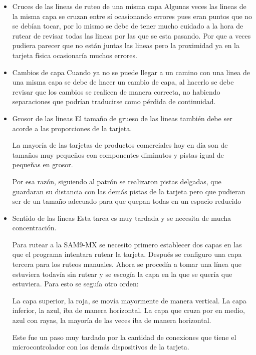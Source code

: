 \begin{itemize}
\item{Cruces de las lineas de ruteo de una misma capa}
Algunas veces las lineas de la misma capa se cruzan entre sí ocasionando errores pues eran puntos que no se debían tocar, por lo mismo se debe de tener mucho cuidado a la hora de rutear de revisar todas las lineas por las que se esta pasando. Por que a veces pudiera parecer que no están juntas las lineas pero la proximidad ya en la tarjeta física ocasionaría muchos errores.

\item{Cambios de capa}
Cuando ya no se puede llegar a un camino con una linea de una misma capa se debe de hacer un cambio de capa, al hacerlo se debe revisar que los cambios se realicen de manera correcta, no habiendo separaciones que podrían traducirse como pérdida de continuidad.

\item{Grosor de las lineas}
El tamaño de grueso de las lineas también debe ser acorde a las proporciones de la tarjeta. 

La mayoría de las tarjetas de productos comerciales hoy en día son de tamaños muy pequeños con componentes diminutos y pistas igual de pequeñas en grosor. 

Por esa razón, siguiendo al patrón se realizaron pistas delgadas, que guardaran su distancia con las demás pistas de la tarjeta pero que pudieran ser de un tamaño adecuado para que quepan todas en un espacio reducido

\item{Sentido de las lineas}
Esta tarea es muy tardada y se necesita de mucha concentración.

Para rutear a la SAM9-MX se necesito primero establecer dos capas en las que el programa intentara rutear la tarjeta. Después se configuro una capa tercera para los ruteos manuales. Ahora se procedía a tomar una línea que estuviera todavía sin rutear y se escogía la capa en la que se quería que estuviera. Para esto se seguía otro orden:

La capa superior, la roja, se movía mayormente de manera vertical.
La capa inferior, la azul, iba de manera horizontal.
La capa que cruza por en medio, azul con rayas, la mayoría de las veces iba de manera horizontal.

Este fue un paso muy tardado por la cantidad de conexiones que tiene el microcontrolador con los demás dispositivos de la tarjeta. 
\end{itemize}

